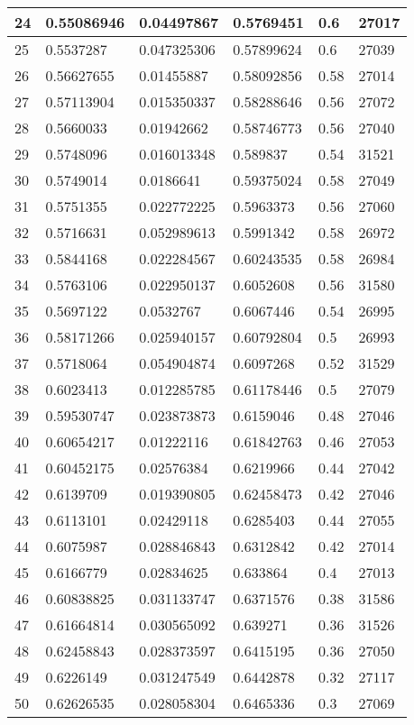 \begin{longtable}{|l|l|l|l|l|l|}
24 & 0.55086946 & 0.04497867 & 0.5769451 & 0.6 & 27017 \\ \hline 
25 & 0.5537287 & 0.047325306 & 0.57899624 & 0.6 & 27039 \\ \hline 
26 & 0.56627655 & 0.01455887 & 0.58092856 & 0.58 & 27014 \\ \hline 
27 & 0.57113904 & 0.015350337 & 0.58288646 & 0.56 & 27072 \\ \hline 
28 & 0.5660033 & 0.01942662 & 0.58746773 & 0.56 & 27040 \\ \hline 
29 & 0.5748096 & 0.016013348 & 0.589837 & 0.54 & 31521 \\ \hline 
30 & 0.5749014 & 0.0186641 & 0.59375024 & 0.58 & 27049 \\ \hline 
31 & 0.5751355 & 0.022772225 & 0.5963373 & 0.56 & 27060 \\ \hline 
32 & 0.5716631 & 0.052989613 & 0.5991342 & 0.58 & 26972 \\ \hline 
33 & 0.5844168 & 0.022284567 & 0.60243535 & 0.58 & 26984 \\ \hline 
34 & 0.5763106 & 0.022950137 & 0.6052608 & 0.56 & 31580 \\ \hline 
35 & 0.5697122 & 0.0532767 & 0.6067446 & 0.54 & 26995 \\ \hline 
36 & 0.58171266 & 0.025940157 & 0.60792804 & 0.5 & 26993 \\ \hline 
37 & 0.5718064 & 0.054904874 & 0.6097268 & 0.52 & 31529 \\ \hline 
38 & 0.6023413 & 0.012285785 & 0.61178446 & 0.5 & 27079 \\ \hline 
39 & 0.59530747 & 0.023873873 & 0.6159046 & 0.48 & 27046 \\ \hline 
40 & 0.60654217 & 0.01222116 & 0.61842763 & 0.46 & 27053 \\ \hline 
41 & 0.60452175 & 0.02576384 & 0.6219966 & 0.44 & 27042 \\ \hline 
42 & 0.6139709 & 0.019390805 & 0.62458473 & 0.42 & 27046 \\ \hline 
43 & 0.6113101 & 0.02429118 & 0.6285403 & 0.44 & 27055 \\ \hline 
44 & 0.6075987 & 0.028846843 & 0.6312842 & 0.42 & 27014 \\ \hline 
45 & 0.6166779 & 0.02834625 & 0.633864 & 0.4 & 27013 \\ \hline 
46 & 0.60838825 & 0.031133747 & 0.6371576 & 0.38 & 31586 \\ \hline 
47 & 0.61664814 & 0.030565092 & 0.639271 & 0.36 & 31526 \\ \hline 
48 & 0.62458843 & 0.028373597 & 0.6415195 & 0.36 & 27050 \\ \hline 
49 & 0.6226149 & 0.031247549 & 0.6442878 & 0.32 & 27117 \\ \hline 
50 & 0.62626535 & 0.028058304 & 0.6465336 & 0.3 & 27069 \\ \hline 
\end{longtable}